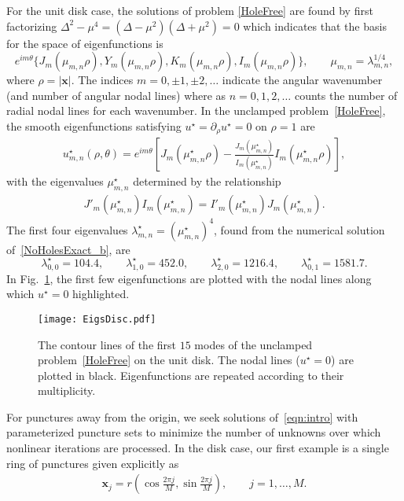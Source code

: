 \documentclass[times]{article}
\newcommand{\xx}{\mathbf{x}}
\newcommand{\bsub}{\begin{subequations}}
\newcommand{\esub}{\end{subequations}$\!$}
\begin{document}
For the unit disk case, the solutions of problem \eqref{HoleFree} are
found by first factorizing $\Delta^2 - \mu^4 = (\Delta -\mu^2)(\Delta +
\mu^2)=0$ which indicates that the basis for the space of eigenfunctions
is
\begin{equation*}
 e^{im \theta} \{  J_m(\mu_{m,n} \rho), Y_m(\mu_{m,n} \rho), K_m(\mu_{m,n} \rho), I_m(\mu_{m,n} \rho) \}, \qquad \mu_{m,n} = \lambda_{m,n}^{1/4},
\end{equation*}
where $\rho = |\xx|$. The indices $m = 0, \pm 1, \pm2, \ldots$ indicate
the angular wavenumber (and number of angular nodal lines) where as
$n=0,1,2,\ldots$ counts the number of radial nodal lines for each
wavenumber. In the unclamped problem~\eqref{HoleFree}, the smooth
eigenfunctions satisfying $u^{\star} = \partial_{\rho} u^{\star} = 0$
on $\rho=1$ are
\begin{align*}
  u^{\star}_{m,n}(\rho,\theta) = e^{im\theta} \left[ J_m(\mu^{\star}_{m,n}\rho) - 
    \frac{J_m(\mu^{\star}_{m,n})}{I_m(\mu^{\star}_{m,n})} 
    I_m(\mu^{\star}_{m,n}\rho) \right],
\end{align*}
with the eigenvalues $\mu^{\star}_{m,n}$ determined by the relationship
\begin{align}\label{NoHolesExact_b}
J'_m(\mu^{\star}_{m,n})I_m(\mu^{\star}_{m,n}) = I'_m(\mu^{\star}_{m,n}) J_m(\mu^{\star}_{m,n}).
\end{align}
The first four eigenvalues $\lambda^{\star}_{m,n} =
(\mu^{\star}_{m,n})^4$, found from the numerical solution
of~\eqref{NoHolesExact_b}, are
\begin{equation}\label{eigsDiskPFree}
\lambda^{\star}_{0,0} = 104.4, \qquad \lambda^{\star}_{1,0} = 452.0, \qquad \lambda^{\star}_{2,0} = 1216.4, \qquad \lambda^{\star}_{0,1} = 1581.7.
\end{equation}
In Fig.~\ref{fig:NoHoles}, the first few eigenfunctions are plotted with the nodal lines along which $u^{\star}=0$ highlighted.
%
\begin{figure}[htbp]
\centering
\texttt{[image: EigsDisc.pdf]}
\parbox{0.75\textwidth}{\caption{The contour lines of the first $15$
modes of the unclamped problem~\eqref{HoleFree} on the unit disk.  The
nodal lines ($u^{\star}=0$) are plotted in black.  Eigenfunctions are
repeated according to their multiplicity.  \label{fig:NoHoles}}}
\end{figure}
%
For punctures away from the origin, we seek solutions
of~\eqref{eqn:intro} with parameterized puncture sets to minimize the
number of unknowns over which nonlinear iterations are processed. In the
disk case, our first example is a single ring of punctures given
explicitly as
\begin{align}
  \label{singleRing}
    \xx_j =  r \left( \cos\frac{2\pi j}{M}, 
    \sin \frac{2\pi j}{M} \right), \qquad j = 1,\ldots, M.
\end{align}
\end{document}
